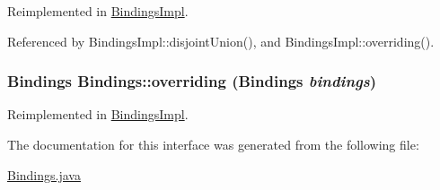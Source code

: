 Reimplemented in \hyperlink{classBindingsImpl_a0}{Bindings\-Impl}.

Referenced by Bindings\-Impl::disjoint\-Union(), and Bindings\-Impl::overriding().

\hypertarget{interfaceBindings_a3}{
\subsubsection[overriding]{\setlength{\rightskip}{0pt plus 5cm}Bindings Bindings::overriding (Bindings {\em bindings})}}
\label{interfaceBindings_a3}




Reimplemented in \hyperlink{classBindingsImpl_a3}{Bindings\-Impl}.

The documentation for this interface was generated from the following file:\begin{CompactItemize}
\item 
\hyperlink{Bindings_8java-source}{Bindings.java}\end{CompactItemize}
